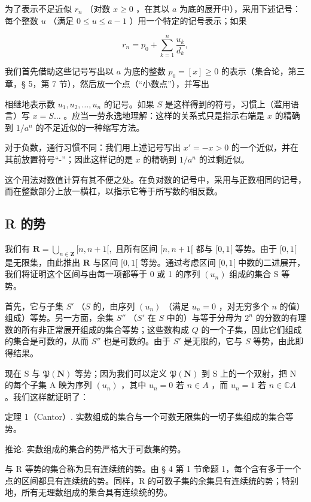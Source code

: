 为了表示不足近似 \(r_n\) （对数 \(x \geqslant 0\) ，在其以 \(a\) 为底的展开中），采用下述记号：每个整数 \(u\) （满足 \(0 \leqslant u \leqslant a - 1\) ）用一个特定的记号表示；如果

\[
r _ {n} = p _ {0} + \sum_ {k = 1} ^ {n} \frac {u _ {k}}{d _ {k}},
\]

我们首先借助这些记号写出以 \(a\) 为底的整数 \(p_{0}=[x]\geqslant0\) 的表示（集合论，第三章，§ 5，第 7 节），然后放一个点（``小数点''），并写出

相继地表示数 \(u_1, u_2, \ldots, u_n\) 的记号。如果 \(S\) 是这样得到的符号，习惯上（滥用语言）写 \(x = S \ldots\) 。应当一劳永逸地理解：这样的关系式只是指示右端是 \(x\) 的精确到 \(1/a^n\) 的不足近似的一种缩写方法。

对于负数，通行习惯不同：我们用上述记号写出 \(x' = -x > 0\) 的一个近似，并在其前放置符号``-''；因此这样记的是 \(x\) 的精确到 \(1/a^n\) 的过剩近似。

这个用法对数值计算有其不便之处。在负对数的记号中，采用与正数相同的记号，而在整数部分上放一横杠，以指示它等于所写数的相反数。

\subsection{R 的势}

我们有 \(\mathbf{R} = \bigcup_{n\in \mathbf{Z}}[n,n + 1[,\) 且所有区间 \([n,n + 1[\) 都与 \([0,1[\) 等势。由于 \([0,1[\) 是无限集，由此推出 \(\mathbf{R}\) 与区间 \([0,1[\) 等势。通过考虑区间 \([0,1[\) 中数的二进展开，我们将证明这个区间与由每一项都等于 0 或 1 的序列 \((u_n)\) 组成的集合 S 等势。

首先，它与子集 \(S'\) （\(S\) 的，由序列 \((u_n)\) （满足 \(u_n = 0\) ，对无穷多个 \(n\) 的值）组成）等势。另一方面，余集 \(S''\) （\(S'\) 在 \(S\) 中的）与等于分母为 \(2^n\) 的分数的有理数的所有非正常展开组成的集合等势；这些数构成 \(Q\) 的一个子集，因此它们组成的集合是可数的，从而 \(S''\) 也是可数的。由于 \(S'\) 是无限的，它与 \(S\) 等势，由此即得结果。

现在 S 与 \(\mathfrak{P}(\mathbf{N})\) 等势；因为我们可以定义 \(\mathfrak{P}(\mathbf{N})\) 到 S 上的一个双射，把 N 的每个子集 A 映为序列 \((u_n)\) ，其中 \(u_n = 0\) 若 \(n \in A\) ，而 \(u_n = 1\) 若 \(n \in \mathbb{C}A\) 。我们这样就证明了：

定理 1（Cantor）. 实数组成的集合与一个可数无限集的一切子集组成的集合等势。

推论. 实数组成的集合的势严格大于可数集的势。

与 R 等势的集合称为具有连续统的势。由 § 4 第 1 节命题 1，每个含有多于一个点的区间都具有连续统的势。同样，R 的可数子集的余集具有连续统的势；特别地，所有无理数组成的集合具有连续统的势。

